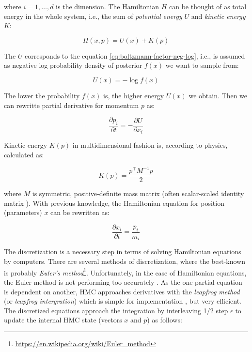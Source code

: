 \documentclass[
  digital, %
  oneside, %
  lof,     %
  lot,     %
]{fithesis4}
\begin{document}
where $i = 1, \dots, d$ is the dimension.
The Hamiltonian $H$ can be thought of as total energy in the whole system, i.e., the sum of \textit{potential energy} $U$ and \textit{kinetic energy} $K$:

\begin{equation}
  H(x, p) = U(x) + K(p)
\end{equation}

The $U$ corresponds to the equation \eqref{eq:boltzmann-factor-neg-log}, i.e., is assumed as negative log probability density of posterior $f(x)$ we want to sample from:

\begin{equation}
  U(x) = -\log f(x)
\end{equation}

The lower the probability $f(x)$ is, the higher energy $U(x)$ we obtain. 
Then we can rewritte partial derivative for momentum $p$ as:

\begin{equation}
  \frac{\partial p_i}{\partial t} = - \frac{\partial U}{\partial x_i}
\end{equation}

Kinetic energy $K(p)$ in multidimensional fashion is, according to physics, calculated as:

\begin{equation}
  K(p) = \frac{p^{\top} M^{-1} p}{2}
\end{equation}

where $M$ is symmetric, positive-definite mass matrix (often scalar-scaled identity matrix \cite{neal2011}).
With previous knowledge, the Hamiltonian equation for position (parameters) $x$ can be rewritten as:

\begin{equation}
  \frac{\partial x_i}{\partial t} = \frac{p_i}{m_i}
\end{equation}

The discretization is a necessary step in terms of solving Hamiltonian equations by computers.
There are several methods of discretization, where the best-known is probably \textit{Euler's method}\footnote{\url{https://en.wikipedia.org/wiki/Euler_method}}.
Unfortunately, in the case of Hamiltonian equations, the Euler method is not performing too accurately \cite[Chapter 5]{neal2011}.
As the one partial equation is dependent on another, HMC approaches derivatives with the \textit{leapfrog method} (or \textit{leapfrog intergration}) which is simple for implementation \cite{betancourt2018}, but very efficient.
The discretized equations approach the integration by interleaving 1/2 step $\epsilon$ to update the internal HMC state (vectors $x$ and $p$) as follows:
\end{document}
